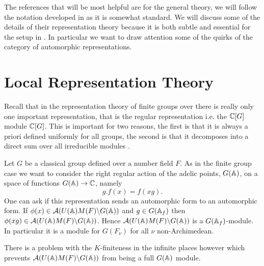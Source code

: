 The references that will be most helpful are \cite[I.II]{borelAutomorphicFormsRepresentations1979}\cite{getzIntroductionAutomorphicRepresentations2024} for the general theory, we will follow the notation developed in \cite{moeglinSpectralDecompositionEisenstein1995} as it is somewhat standard. We will discuss some of the details of their representation theory because it is both subtle and essential for the setup in \cite{jiangPolesCertainResidual2013}. In particular we want to draw attention some of the quirks of the category of automorphic representations. 

\section{Local Representation Theory}
Recall that in the representation theory of finite groups over \C there is really only one important representation, that is the regular representation i.e. the \(\C[G]\) module \(\C[G]\). This is important for two reasons, the first is that it is always a priori defined uniformly for all groups, the second is that it decomposes into a direct sum over all irreducible modules \cite[Ch. 2.4 Cor. 2 ]{serreLinearRepresentationsFinite1996}.

Let \(G\) be a classical group defined over a number field \(F\). 
As in the finite group case we want to consider the right regular action of the adelic points, \(G(\A)\), on a space of functions \(G(\A) \to \C\), namely
\[g.f(x) = f(xg).\]
One can ask if this representation sends an automorphic form to an automorphic form.
If \(\phi(x)\in \mathcal{A}(U(\A)M(F)\backslash G(\A))\) and \(g\in G(\A_f)\) then \(\phi(xg) \in \mathcal{A}(U(\A)M(F)\backslash G(\A)) \). Hence \(\mathcal{A}(U(\A)M(F)\backslash G(\A))\) is a \(G(\A_f)\)-module. In particular it is a module for \(G(F_\nu)\) for all \(\nu\) non-Archimedean.

There is a problem with the \(K\)-finiteness in the infinite places however which prevents \( \mathcal{A}(U(\A)M(F)\backslash G(\A))\) from being a full \(G(\A)\) module.

